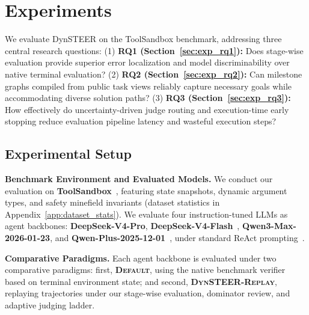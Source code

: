 \section{Experiments}
\label{sec:experiments}

We evaluate DynSTEER on the ToolSandbox benchmark, addressing three central research questions: (1) \textbf{RQ1 (Section~\ref{sec:exp_rq1}):} Does stage-wise evaluation provide superior error localization and model discriminability over native terminal evaluation? (2) \textbf{RQ2 (Section~\ref{sec:exp_rq2}):} Can milestone graphs compiled from public task views reliably capture necessary goals while accommodating diverse solution paths? (3) \textbf{RQ3 (Section~\ref{sec:exp_rq3}):} How effectively do uncertainty-driven judge routing and execution-time early stopping reduce evaluation pipeline latency and wasteful execution steps?

\subsection{Experimental Setup}
\label{sec:exp_setup}
\textbf{Benchmark Environment and Evaluated Models.} We conduct our evaluation on \textbf{ToolSandbox}~\citep{gu2024toolsandbox}, featuring state snapshots, dynamic argument types, and safety minefield invariants (dataset statistics in Appendix~\ref{app:dataset_stats}). We evaluate four instruction-tuned LLMs as agent backbones: \textbf{DeepSeek-V4-Pro}, \textbf{DeepSeek-V4-Flash}~\citep{deepseekai2024deepseekv3}, \textbf{Qwen3-Max-2026-01-23}, and \textbf{Qwen-Plus-2025-12-01}~\citep{yang2024qwen25}, under standard ReAct prompting~\citep{yao2023react}.

\textbf{Comparative Paradigms.} Each agent backbone is evaluated under two comparative paradigms: first, \textbf{\textsc{Default}}, using the native benchmark verifier based on terminal environment state; and second, \textbf{\textsc{DynSTEER-Replay}}, replaying trajectories under our stage-wise evaluation, dominator review, and adaptive judging ladder.

